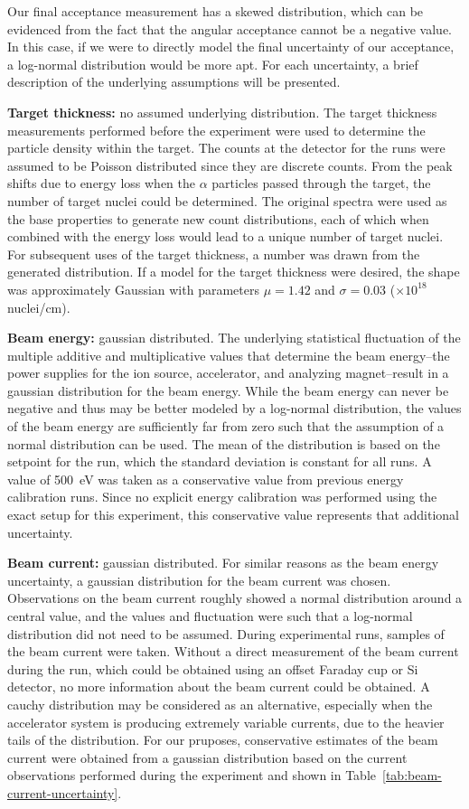 Our final acceptance measurement has a skewed distribution, which can be
evidenced from the fact that the angular acceptance cannot be a negative
value. In this case, if we were to directly model the final uncertainty
of our acceptance, a log-normal distribution would be more apt. For each
uncertainty, a brief description of the underlying assumptions will be
presented.

\textbf{Target thickness:} no assumed underlying distribution. The target
thickness measurements performed before the experiment were used to
determine the particle density within the target. The counts at the
detector for the runs were assumed to be Poisson distributed since they
are discrete counts. From the peak shifts due to energy loss when the
$\alpha$ particles passed through the target, the number of target nuclei
could be determined. The original spectra were used as the base properties
to generate new count distributions, each of which when combined with the
energy loss would lead to a unique number of target nuclei. For subsequent
uses of the target thickness, a number was drawn from the generated distribution.
If a model for the target thickness were desired, the shape was approximately
Gaussian with parameters $\mu = 1.42$ and $\sigma = 0.03$ ($\times 10^{18}$
nuclei/cm\squared{}).

\textbf{Beam energy:} gaussian distributed. The underlying statistical
fluctuation of the multiple additive and multiplicative values that
determine the beam energy\---{}the power supplies for the ion source,
accelerator, and analyzing magnet\---{}result in a gaussian distribution
for the beam energy. While the beam energy can never be negative and thus
may be better modeled by a log-normal distribution, the values of the beam
energy are sufficiently far from zero such that the assumption of a normal
distribution can be used. The mean of the distribution is based on the setpoint
for the run, which the standard deviation is constant for all runs. A
value of 500~eV was taken as a conservative value from previous energy
calibration runs. Since no explicit energy calibration was performed
using the exact setup for this experiment, this conservative value
represents that additional uncertainty.

\textbf{Beam current:} gaussian distributed. For similar reasons as the
beam energy uncertainty, a gaussian distribution for the beam current
was chosen. Observations on the beam current roughly showed a normal
distribution around a central value, and the values and fluctuation were
such that a log-normal distribution did not need to be assumed. During
experimental runs, samples of the beam current were taken. Without a direct
measurement of the beam current during the run, which could be obtained
using an offset Faraday cup or Si detector, no more information about the
beam current could be obtained. A cauchy distribution may be considered
as an alternative, especially when the accelerator system is producing
extremely variable currents, due to the heavier tails of the distribution.
For our pruposes, conservative estimates of the beam current were obtained
from a gaussian distribution based on the current observations performed
during the experiment and shown in Table~\ref{tab:beam-current-uncertainty}.

